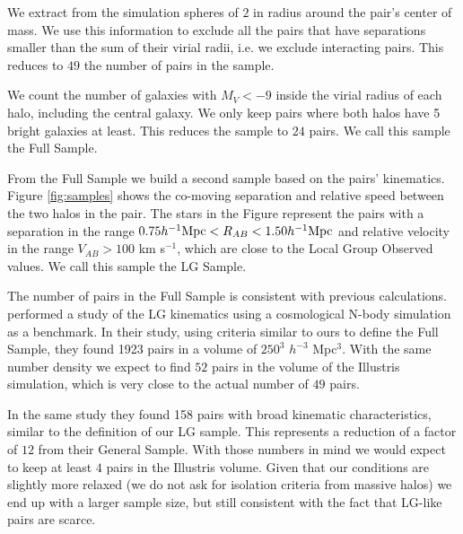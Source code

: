 \documentclass{emulateapj}
\newcommand{\hMpc}{{\ifmmode{h^{-1}{\rm Mpc}}\else{$h^{-1}$Mpc}\fi}}
\begin{document}
We extract from the simulation spheres of $2$ \hMpc  in radius around
the pair's center of mass. 
We use this information to exclude all the pairs that have separations
smaller than the sum of their virial radii, i.e. we exclude
interacting pairs. 
This reduces to $49$ the number of pairs in the sample.

We count the number of galaxies with $M_V<-9$ inside the virial
radius of each halo, including the central galaxy.
We only keep pairs where both halos have 5 bright galaxies at least. 
This reduces the sample to $24$ pairs. 
We call this sample the Full Sample.

From the Full Sample we build a second sample based on the pairs' kinematics. 
Figure \ref{fig:samples} shows the co-moving separation and relative
speed between the two halos in the pair.
The stars in the Figure represent the pairs with a separation in the
range $0.75\hMpc <R_{AB}< 1.50\hMpc$ and relative velocity in the
range $V_{AB}>100$ km s$^{-1}$, which are close to the Local Group
Observed values.
We call this sample the LG Sample.

The number of pairs in the Full Sample is consistent with previous
calculations. 
\cite{ForeroRomero2013} performed a study of the LG kinematics using a
cosmological N-body simulation as a benchmark. 
In their study, using criteria similar to ours to define the Full
Sample, they found 1923 pairs in a volume of $250^3$ $h^{-3}$
Mpc$^{3}$. 
With the same number density we expect to find $52$ pairs in the
volume of the Illustris simulation, which is very close to the actual
number of $49$ pairs.

In the same study they found 158 pairs with broad kinematic
characteristics, similar to the definition of our LG sample. 
This represents a reduction of a factor of $12$ from their General
Sample. 
With those numbers in mind we would expect to keep at least $4$ pairs
in the Illustris volume. 
Given that our conditions are slightly more relaxed (we do not ask for
isolation criteria from massive halos) we end up with a larger sample
size, but still consistent with the fact that LG-like pairs are
scarce.  
\end{document}
